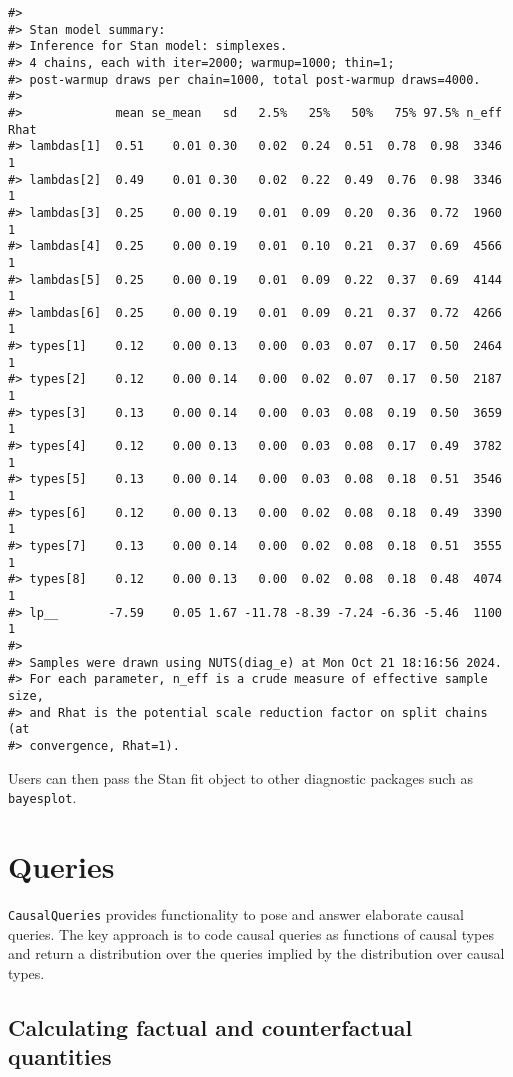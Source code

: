 \documentclass[
  11pt,
  article]{jss}
\begin{document}
\begin{verbatim}
#> 
#> Stan model summary:
#> Inference for Stan model: simplexes.
#> 4 chains, each with iter=2000; warmup=1000; thin=1; 
#> post-warmup draws per chain=1000, total post-warmup draws=4000.
#> 
#>             mean se_mean   sd   2.5%   25%   50%   75% 97.5% n_eff Rhat
#> lambdas[1]  0.51    0.01 0.30   0.02  0.24  0.51  0.78  0.98  3346    1
#> lambdas[2]  0.49    0.01 0.30   0.02  0.22  0.49  0.76  0.98  3346    1
#> lambdas[3]  0.25    0.00 0.19   0.01  0.09  0.20  0.36  0.72  1960    1
#> lambdas[4]  0.25    0.00 0.19   0.01  0.10  0.21  0.37  0.69  4566    1
#> lambdas[5]  0.25    0.00 0.19   0.01  0.09  0.22  0.37  0.69  4144    1
#> lambdas[6]  0.25    0.00 0.19   0.01  0.09  0.21  0.37  0.72  4266    1
#> types[1]    0.12    0.00 0.13   0.00  0.03  0.07  0.17  0.50  2464    1
#> types[2]    0.12    0.00 0.14   0.00  0.02  0.07  0.17  0.50  2187    1
#> types[3]    0.13    0.00 0.14   0.00  0.03  0.08  0.19  0.50  3659    1
#> types[4]    0.12    0.00 0.13   0.00  0.03  0.08  0.17  0.49  3782    1
#> types[5]    0.13    0.00 0.14   0.00  0.03  0.08  0.18  0.51  3546    1
#> types[6]    0.12    0.00 0.13   0.00  0.02  0.08  0.18  0.49  3390    1
#> types[7]    0.13    0.00 0.14   0.00  0.02  0.08  0.18  0.51  3555    1
#> types[8]    0.12    0.00 0.13   0.00  0.02  0.08  0.18  0.48  4074    1
#> lp__       -7.59    0.05 1.67 -11.78 -8.39 -7.24 -6.36 -5.46  1100    1
#> 
#> Samples were drawn using NUTS(diag_e) at Mon Oct 21 18:16:56 2024.
#> For each parameter, n_eff is a crude measure of effective sample size,
#> and Rhat is the potential scale reduction factor on split chains (at 
#> convergence, Rhat=1).
\end{verbatim}

Users can then pass the Stan fit object to other diagnostic packages
such as \texttt{bayesplot}.

\section{Queries}\label{sec-query}

\texttt{CausalQueries} provides functionality to pose and answer
elaborate causal queries. The key approach is to code causal queries as
functions of causal types and return a distribution over the queries
implied by the distribution over causal types.

\subsection{Calculating factual and counterfactual
quantities}\label{sec-propagation}
\end{document}
